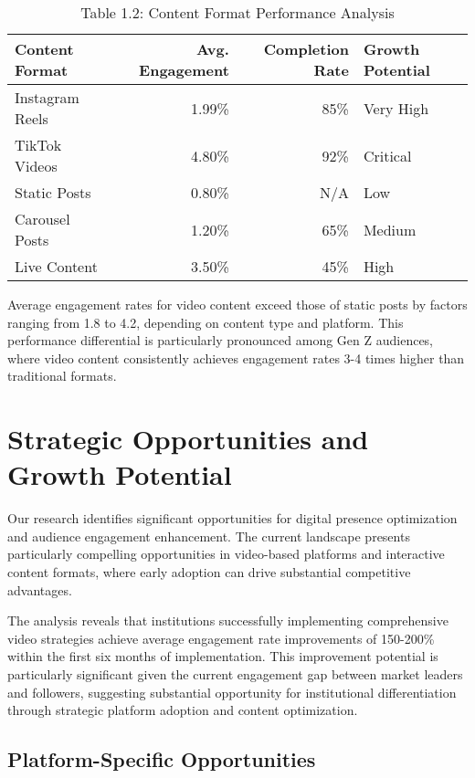 \documentclass[12pt]{report}
\begin{document}
\begin{table}[h]
\centering
\caption{Table 1.2: Content Format Performance Analysis}
\begin{tabular}{@{}lrrl@{}}
\toprule
\textbf{Content Format} & \textbf{Avg. Engagement} & \textbf{Completion Rate} & \textbf{Growth Potential} \\
\midrule
Instagram Reels & 1.99\% & 85\% & Very High \\
TikTok Videos & 4.80\% & 92\% & Critical \\
Static Posts & 0.80\% & N/A & Low \\
Carousel Posts & 1.20\% & 65\% & Medium \\
Live Content & 3.50\% & 45\% & High \\
\bottomrule
\end{tabular}
\end{table}

Average engagement rates for video content exceed those of static posts by factors ranging from 1.8 to 4.2, depending on content type and platform. This performance differential is particularly pronounced among Gen Z audiences, where video content consistently achieves engagement rates 3-4 times higher than traditional formats.

\chapter{Strategic Opportunities and Growth Potential}

Our research identifies significant opportunities for digital presence optimization and audience engagement enhancement. The current landscape presents particularly compelling opportunities in video-based platforms and interactive content formats, where early adoption can drive substantial competitive advantages.

The analysis reveals that institutions successfully implementing comprehensive video strategies achieve average engagement rate improvements of 150-200\% within the first six months of implementation. This improvement potential is particularly significant given the current engagement gap between market leaders and followers, suggesting substantial opportunity for institutional differentiation through strategic platform adoption and content optimization.

\section{Platform-Specific Opportunities}
\end{document}
